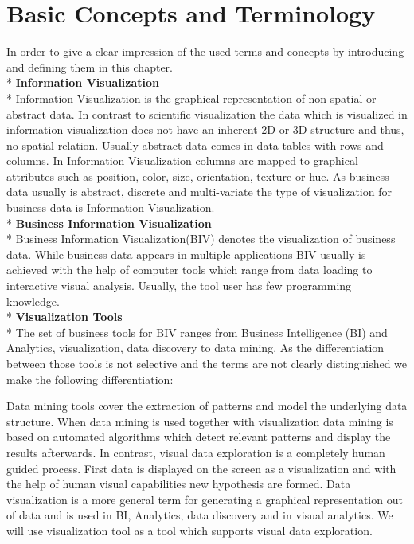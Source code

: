 \chapter{Basic Concepts and Terminology}
\label{concepts}
In order to give a clear impression of the used terms and concepts by introducing and defining them in this chapter.\\*
\textbf{Information Visualization}\\*
Information Visualization is the graphical representation of non-spatial or abstract data\cite{Keim}. In contrast to scientific visualization the data which is visualized in information visualization does not have an inherent 2D or 3D structure\cite{Shneiderman2008} and thus, no spatial relation. Usually abstract data comes in data tables with rows and columns. In Information Visualization columns are mapped to graphical attributes such as position, color, size, orientation, texture or hue. 
As business data usually is abstract, discrete and multi-variate\cite{Tegarden1999} the type of visualization for business data is Information Visualization.\\*
\textbf{Business Information Visualization}\label{BIV}\\*
Business Information Visualization(BIV) denotes the visualization of business data. While business data appears in multiple applications BIV usually is achieved with the help of computer tools which range from data loading to interactive visual analysis. Usually, the tool user has few programming knowledge. \\*
\textbf{Visualization Tools}\\*
The set of business tools for BIV ranges from Business Intelligence (BI) and Analytics, visualization, data discovery to data mining. As the differentiation between those tools is not selective and the terms are not clearly distinguished we make the following differentiation:

Data mining tools cover the extraction of patterns and model the underlying data structure\cite{FerreiradeOliveira2003}. When data mining is used together with visualization data mining is based on automated algorithms which detect relevant patterns and display the results afterwards. In contrast, visual data exploration is a completely human guided process\cite{FerreiradeOliveira2003}. First data is displayed on the screen as a visualization and with the help of human visual capabilities new hypothesis are formed. Data visualization is a more general term for generating a graphical representation out of data and is used in BI, Analytics, data discovery and in visual analytics. We will use visualization tool as a tool which supports visual data exploration. 

